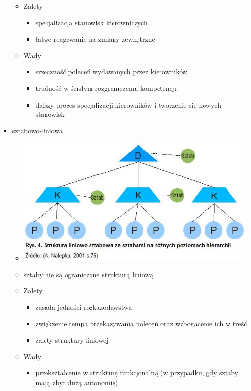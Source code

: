 \documentclass[a4paper,10pt]{report}
\begin{document}
\begin{itemize}
\begin{itemize}
		\item Zalety
		\begin{itemize}
			\item specjalizacja stanowisk kierowniczych
			\item łatwe reagowanie na zmiany zewnętrzne
		\end{itemize}
		\item Wady
		\begin{itemize}
			\item srzeczność poleceń wydawanych przez kierowników
			\item trudność w ścisłym rozgraniczeniu kompetencji
			\item dalszy proces specjalizacji kierowników i tworzenie się nowych stanowisk
		\end{itemize}
	\end{itemize}
	\item sztabowo-liniowa
	\begin{itemize}
		\item \includegraphics[scale=0.8]{assets/str_sztabowo_liniowa}
		\item sztaby nie są ograniczone strukturą liniową
		\item Zalety
		\begin{itemize}
			\item zasada jedności rozkazodawstwa
			\item zwiękzenie tempa przekazywania poleceń oraz wzbogacenie ich w treść
			\item zalety struktury liniowej
		\end{itemize}
		\item Wady
		\begin{itemize}
			\item przekształcenie w strukturę funkcjonalną (w przypadku, gdy sztaby mają zbyt dużą autonomię)
		\end{itemize}

\end{itemize}
\end{itemize}
\end{document}
